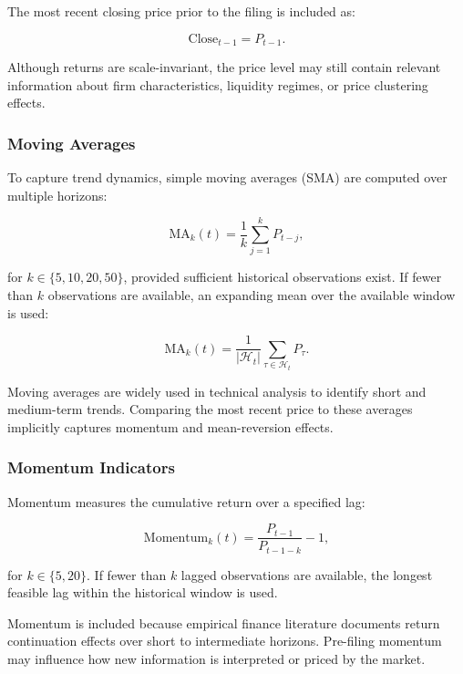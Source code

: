 The most recent closing price prior to the filing is included as:

\begin{equation}
\text{Close}_{t-1} = P_{t-1}.
\end{equation}

Although returns are scale-invariant, the price level may still contain relevant information about firm characteristics, liquidity regimes, or price clustering effects.

\subsubsection*{Moving Averages}

To capture trend dynamics, simple moving averages (SMA) are computed over multiple horizons:

\begin{equation}
\text{MA}_k(t) = \frac{1}{k} \sum_{j=1}^{k} P_{t-j},
\end{equation}

for $k \in \{5, 10, 20, 50\}$, provided sufficient historical observations exist. If fewer than $k$ observations are available, an expanding mean over the available window is used:

\begin{equation}
\text{MA}_k(t) = \frac{1}{|\mathcal{H}_t|} \sum_{\tau \in \mathcal{H}_t} P_\tau.
\end{equation}

Moving averages are widely used in technical analysis to identify short and medium-term trends. Comparing the most recent price to these averages implicitly captures momentum and mean-reversion effects.

\subsubsection*{Momentum Indicators}

Momentum measures the cumulative return over a specified lag:

\begin{equation}
\text{Momentum}_k(t) = \frac{P_{t-1}}{P_{t-1-k}} - 1,
\end{equation}

for $k \in \{5, 20\}$. If fewer than $k$ lagged observations are available, the longest feasible lag within the historical window is used.

Momentum is included because empirical finance literature documents return continuation effects over short to intermediate horizons. Pre-filing momentum may influence how new information is interpreted or priced by the market.

